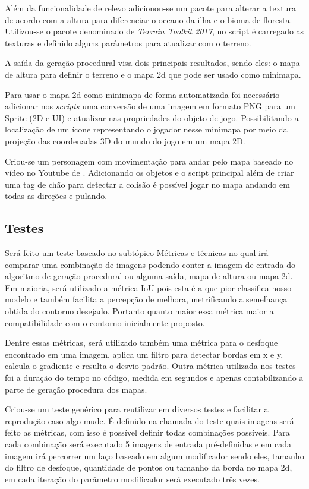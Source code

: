 Além da funcionalidade de relevo adicionou-se um pacote para alterar a textura de acordo com a altura para diferenciar o oceano da ilha e o bioma de floresta. Utilizou-se o pacote denominado de \textit{Terrain Toolkit 2017}, no script é carregado as texturas e definido alguns parâmetros para atualizar com o terreno.

A saída da geração procedural visa dois principais resultados, sendo eles: o mapa de altura para definir o terreno e o mapa 2d que pode ser usado como minimapa.

Para usar o mapa 2d como minimapa de forma automatizada foi necessário adicionar nos \textit{scripts} uma conversão de uma imagem em formato PNG para um Sprite (2D e UI) e atualizar nas propriedades do objeto de jogo. Possibilitando a localização de um ícone representando o jogador nesse minimapa por meio da projeção das coordenadas 3D do mundo do jogo em um mapa 2D.


Criou-se um personagem com movimentação para andar pelo mapa baseado no vídeo no Youtube de . Adicionando os objetos e o script principal além de criar uma tag de chão para detectar a colisão é possível jogar no mapa andando em todas as direções e pulando.
\subsection{Testes}

Será feito um teste baseado no subtópico \hyperref[sec:metricas_tecnicas]{Métricas e técnicas} no qual irá comparar uma combinação de imagens podendo conter a imagem de entrada do algoritmo de geração procedural ou alguma saída, mapa de altura ou mapa 2d. Em maioria, será utilizado a métrica IoU pois esta é a que pior classifica nosso modelo e também facilita a percepção de melhora, metrificando a semelhança obtida do contorno desejado. Portanto quanto maior essa métrica maior a compatibilidade com o contorno inicialmente proposto.

Dentre essas métricas, será utilizado também uma métrica para o desfoque encontrado em uma imagem, aplica um filtro para detectar bordas em x e y, calcula o gradiente e resulta o desvio padrão. Outra métrica utilizada nos testes foi a duração do tempo no código, medida em segundos e apenas contabilizando a parte de geração procedura dos mapas.

Criou-se um teste genérico para reutilizar em diversos testes e facilitar a reprodução caso algo mude. É definido na chamada do teste quais imagens será feito as métricas, com isso é possível definir todas combinações possíveis. Para cada combinação será executado 5 imagens de entrada pré-definidas e em cada imagem irá percorrer um laço baseado em algum modificador sendo eles, tamanho do filtro de desfoque, quantidade de pontos ou tamanho da borda no mapa 2d, em cada iteração do parâmetro modificador será executado três vezes.

